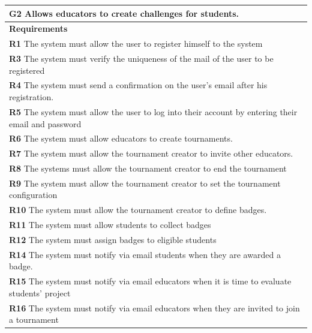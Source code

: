 \begin{table}[H]
    \begin{tabularx}{\textwidth}{X}
        \toprule
        \textbf{G2} Allows educators to create challenges for students.                                                    \\ \midrule
        \textbf{Requirements}                                                                                                        \\ \midrule
        \textbf{R1} The system must allow the user to register himself to the system                                                   \\
        \textbf{R3} The system must verify the uniqueness of the mail of the user to be registered                                       \\ 
        \textbf{R4} The system must send a confirmation on the user's email after his registration.                         \\ 
        \textbf{R5} The system must allow the user to log into their account by entering their email and password           \\
        \textbf{R6} The system must allow educators to create tournaments.              \\ 
        \textbf{R7} The system must allow the tournament creator to invite other educators.         \\ 
        \textbf{R8} The systems must allow the tournament creator to end the tournament     \\ 
        \textbf{R9} The system must allow the tournament creator to set the tournament configuration          \\ 
        \textbf{R10} The system must allow the tournament creator to define badges.      \\ 
        \textbf{R11} The system must allow students to collect badges        \\ 
        \textbf{R12} The system must assign badges to eligible students          \\  
        \textbf{R14} The system must notify via email students when they are awarded a badge. \\ 
        \textbf{R15} The system must notify via email educators when it is time to evaluate students' project      \\ 
        \textbf{R16} The system must notify via email educators when they are invited to join a tournament      \\

\end{tabularx}
\end{table}
